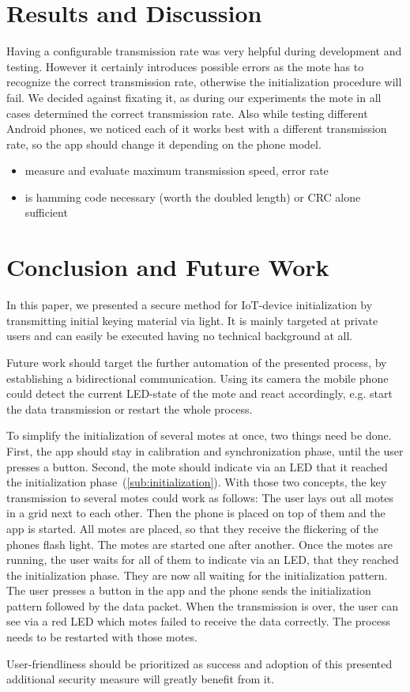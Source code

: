 \documentclass{sig-alternate} %
\begin{document}
\section{Results and Discussion}
\label{sec:results_and_discussion}

Having a configurable transmission rate was very helpful during development and testing.
However it certainly introduces possible errors as the mote has to recognize the correct transmission rate, otherwise the initialization procedure will fail.
We decided against fixating it, as during our experiments the mote in all cases determined the correct transmission rate.
Also while testing different Android phones, we noticed each of it works best with a different transmission rate, so the app should change it depending on the phone model.

\begin{itemize}
	\item measure and evaluate maximum transmission speed, error rate
	\item is hamming code necessary (worth the doubled length) or CRC alone sufficient
\end{itemize}



\section{Conclusion and Future Work}
\label{sec:future_work}

In this paper, we presented a secure method for IoT-device initialization by transmitting initial keying material via light.
It is mainly targeted at private users and can easily be executed having no technical background at all.

Future work should target the further automation of the presented process, by establishing a bidirectional communication.
Using its camera the mobile phone could detect the current LED-state of the mote and react accordingly, e.g. start the data transmission or restart the whole process.

To simplify the initialization of several motes at once, two things need be done.
First, the app should stay in calibration and synchronization phase, until the user presses a button.
Second, the mote should indicate via an LED that it reached the initialization phase~(\ref{sub:initialization}).
With those two concepts, the key transmission to several motes could work as follows:
The user lays out all motes in a grid next to each other.
Then the phone is placed on top of them and the app is started.
All motes are placed, so that they receive the flickering of the phones flash light.
The motes are started one after another.
Once the motes are running, the user waits for all of them to indicate via an LED, that they reached the initialization phase.
They are now all waiting for the initialization pattern.
The user presses a button in the app and the phone sends the initialization pattern followed by the data packet.
When the transmission is over, the user can see via a red LED which motes failed to receive the data correctly.
The process needs to be restarted with those motes.


User-friendliness should be prioritized as success and adoption of this presented additional security measure will greatly benefit from it.




\end{document}
